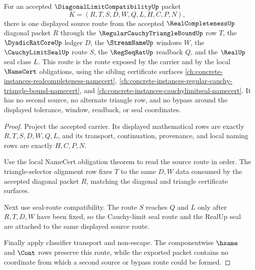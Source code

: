 \begin{theorem}
\label{thm:diagonal-limit-compatibility-source-route-exactness}
For an accepted $\DiagonalLimitCompatibilityUp$ packet
$$
K=(R,T,S,D,W,Q,L,H,C,P,N),
$$
there is one displayed source route from the accepted
$\RealCompletenessUp$ diagonal packet $R$ through the
$\RegularCauchyTriangleBoundUp$ row $T$, the $\DyadicRatCoreUp$ ledger $D$,
the $\StreamNameUp$ windows $W$, the $\CauchyLimitSealUp$ route $S$, the
$\RegSeqRatUp$ readback $Q$, and the $\RealUp$ seal class $L$. This route is
the route exposed by the carrier and by the local $\NameCert$ obligations,
using the sibling certificate surfaces
\autoref{ch:concrete-instances-realcompleteness-namecert},
\autoref{ch:concrete-instances-regular-cauchy-triangle-bound-namecert}, and
\autoref{ch:concrete-instances-cauchylimitseal-namecert}. It has no second
source, no alternate triangle row, and no bypass around the displayed
tolerance, window, readback, or seal coordinates.
\end{theorem}
\begin{proof}
Project the accepted carrier. Its displayed mathematical rows are exactly
$R,T,S,D,W,Q,L$, and its transport, continuation, provenance, and local naming
rows are exactly $H,C,P,N$.

Use the local NameCert obligation theorem to read the source route in order.
The triangle-selector alignment row fixes $T$ to the same $D,W$ data consumed
by the accepted diagonal packet $R$, matching the diagonal and triangle
certificate surfaces.

Next use seal-route compatibility. The route $S$ reaches $Q$ and $L$ only
after $R,T,D,W$ have been fixed, so the Cauchy-limit seal route and the
RealUp seal are attached to the same displayed source route.

Finally apply classifier transport and non-escape. The componentwise
$\hsame$ and $\Cont$ rows preserve this route, while the exported packet
contains no coordinate from which a second source or bypass route could be
formed.
\end{proof}

